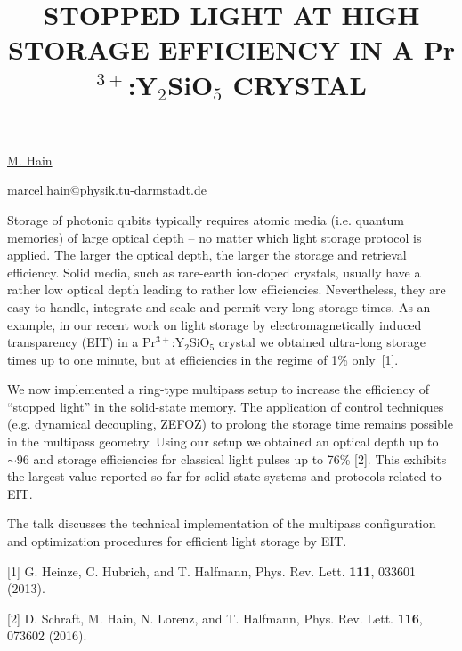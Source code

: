 \title{STOPPED LIGHT AT HIGH STORAGE EFFICIENCY IN A Pr$^{3+}$:Y$_2$SiO$_5$ CRYSTAL}

\underline{M. Hain} 

{\normalsize{\vspace{-4mm}
\darmstadt

\email marcel.hain@physik.tu-darmstadt.de}}

Storage of photonic qubits typically requires atomic media (i.e. quantum memories) of large optical depth -- no matter which light storage protocol is applied. The larger the optical depth, the larger the storage and retrieval efficiency. Solid media, such as rare-earth ion-doped crystals, usually have a rather low optical depth leading to rather low efficiencies. Nevertheless, they are easy to handle, integrate and scale and permit very long storage times. As an example, in our recent work on light storage by electromagnetically induced transparency (EIT) in a Pr$^{3+}$:Y$_2$SiO$_5$ crystal we obtained ultra-long storage times up to one minute, but at efficiencies in the regime of 1\% \mbox{only [1].}

We now implemented a ring-type multipass setup to increase the efficiency of ``stopped light'' in the solid-state memory. The application of control techniques (e.g. dynamical decoupling, ZEFOZ) to prolong the storage time remains possible in the multipass geometry. Using our setup we obtained an optical depth up to $\sim 96$ and storage efficiencies for classical light pulses up to 76\% [2]. This exhibits the largest value reported so far for solid state systems and protocols related to EIT.

The talk discusses the technical implementation of the multipass configuration and optimization procedures for efficient light storage by EIT.

{\normalsize
[1] G. Heinze, C. Hubrich, and T. Halfmann, Phys. Rev. Lett. \textbf{111}, 033601 (2013).
\vsp

[2] D. Schraft, M. Hain, N. Lorenz, and T. Halfmann, Phys. Rev. Lett. \textbf{116}, 073602 (2016).
}

\vspace{\baselineskip} 